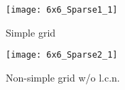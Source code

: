 \begin{figure}[t] 
  \label{fig:grid_types} 
  \begin{minipage}[b]{0.5\linewidth}
    \centering
    \texttt{[image: 6x6\_Sparse1\_1]}
    \caption{Simple grid}
    \label{fig:grid1}
    \vspace{4ex}
  \end{minipage}
  \begin{minipage}[b]{0.5\linewidth}
    \centering
    \texttt{[image: 6x6\_Sparse2\_1]}
    \caption{Non-simple grid w/o l.c.n.}
    \label{fig:grid2}
    \vspace{4ex}%
  \end{minipage}
\end{figure}